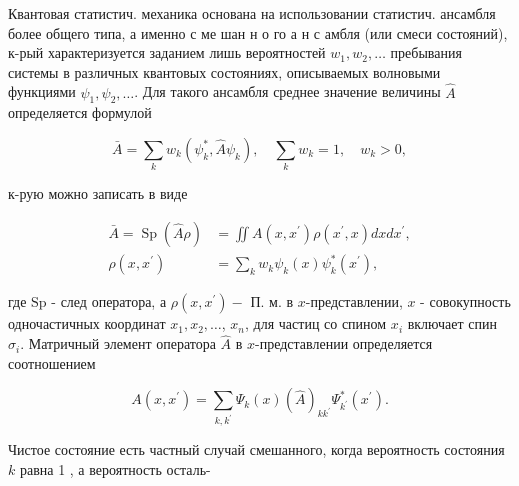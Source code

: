 \documentclass[10pt]{article}
\begin{document}
Квантовая статистич. механика основана на использовании статистич. ансамбля более общего типа, а именно с ме шан н о го а н с амбля (или смеси состояний), к-рый характеризуется заданием лишь вероятностей $w_{1}, w_{2}, \ldots$ пребывания системы в различных квантовых состояниях, описываемых волновыми функциями $\psi_{1}, \psi_{2}, \ldots$. Для такого ансамбля среднее значение величины $\hat{A}$ определяется формулой



\[

\bar{A}=\sum_{k} w_{k}\left(\psi_{k}^{*}, \hat{A} \psi_{k}\right), \quad \sum_{k} w_{k}=1, \quad w_{k}>0,

\]



к-рую можно записать в виде



\[

\begin{aligned}

\bar{A}=\operatorname{Sp}(\hat{A} \rho) & =\iint A\left(x, x^{\prime}\right) \rho\left(x^{\prime}, x\right) d x d x^{\prime}, \\

\rho\left(x, x^{\prime}\right) & =\sum_{k} w_{k} \psi_{k}(x) \psi_{k}^{*}\left(x^{\prime}\right),

\end{aligned}

\]



где $\mathrm{Sp}$ - след оператора, а $\rho\left(x, x^{\prime}\right)-$ П. м. в $x$-представлении, $x$ - совокупность одночастичных координат $x_{1}, x_{2}, \ldots$, $x_{n}$, для частиц со спином $x_{i}$ включает спин $\sigma_{i}$. Матричный элемент оператора $\hat{A}$ в $x$-представлении определяется соотношением



\[

A\left(x, x^{\prime}\right)=\sum_{k, k^{\prime}} \Psi_{k}(x)(\hat{A})_{k k^{\prime}} \Psi_{k^{\prime}}^{*}\left(x^{\prime}\right) .

\]



Чистое состояние есть частный случай смешанного, когда вероятность состояния $k$ равна 1 , а вероятность осталь-
\end{document}
